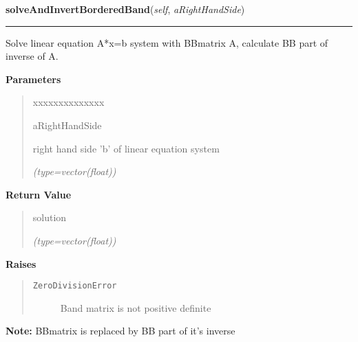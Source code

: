     \label{gblnum:BorderedBandMatrix:solveAndInvertBorderedBand}

    \vspace{0.5ex}

\hspace{.8\funcindent}\begin{boxedminipage}{\funcwidth}

    \raggedright \textbf{solveAndInvertBorderedBand}(\textit{self}, \textit{aRightHandSide})

    \vspace{-1.5ex}

    \rule{\textwidth}{0.5\fboxrule}
\setlength{\parskip}{2ex}
    Solve linear equation A*x=b system with BBmatrix A, calculate BB part 
    of inverse of A.

\setlength{\parskip}{1ex}
      \textbf{Parameters}
      \vspace{-1ex}

      \begin{quote}
        \begin{Ventry}{xxxxxxxxxxxxxx}

          \item[aRightHandSide]

          right hand side 'b' of linear equation system

            {\it (type=vector(float))}

        \end{Ventry}

      \end{quote}

      \textbf{Return Value}
    \vspace{-1ex}

      \begin{quote}
      solution

      {\it (type=vector(float))}

      \end{quote}

      \textbf{Raises}
    \vspace{-1ex}

      \begin{quote}
        \begin{description}

          \item[\texttt{ZeroDivisionError}]

          Band matrix is not positive definite

        \end{description}

      \end{quote}

\textbf{Note:} BBmatrix is replaced by BB part of it's inverse



    \end{boxedminipage}


